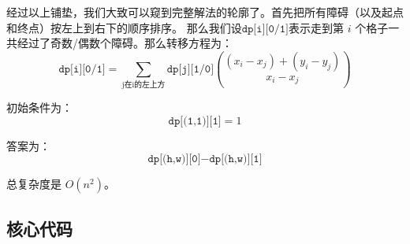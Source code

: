 经过以上铺垫，我们大致可以窥到完整解法的轮廓了。首先把所有障碍（以及起点和终点）按左上到右下的顺序排序。
那么我们设$\texttt{dp[i][0/1]}$表示走到第 $i$ 个格子一共经过了奇数/偶数个障碍。那么转移方程为：
$$
\texttt{dp[i][0/1]} = \sum_{\text{j在i的左上方}} \texttt{dp[j][1/0]} \binom{(x_i-x_j)+(y_i-y_j)}{x_i-x_j}  
$$

初始条件为：
$$
\texttt{dp[(1,1)][1]} = 1
$$

答案为：
$$
\texttt{dp[(h,w)][0]} - \texttt{dp[(h,w)][1]} 
$$

总复杂度是 $O(n^2)$。

\subsection*{核心代码}
\inputminted[linenos,autogobble]{cpp}{../Code/Y.cpp}
\newpage